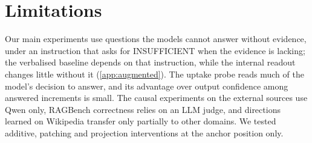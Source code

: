 \section*{Limitations}
Our main experiments use questions the models cannot answer without evidence, under an instruction that asks for INSUFFICIENT when the evidence is lacking; the verbalised baseline depends on that instruction, while the internal readout changes little without it (\cref{app:augmented}). The uptake probe reads much of the model's decision to answer, and its advantage over output confidence among answered increments is small. The causal experiments on the external sources use Qwen only, RAGBench correctness relies on an LLM judge, and directions learned on Wikipedia transfer only partially to other domains. We tested additive, patching and projection interventions at the anchor position only.
